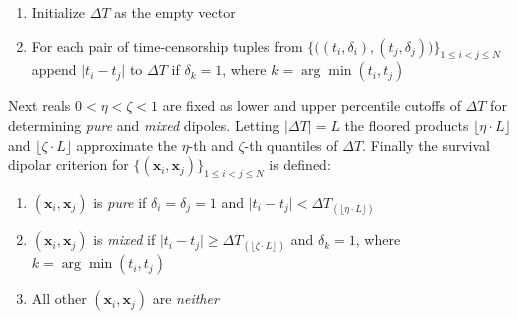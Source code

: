\documentclass[sn-mathphys]{sn-jnl}%
\theoremstyle{thmstyleone}%
\theoremstyle{thmstyletwo}%
\theoremstyle{thmstylethree}%
\begin{document}
\begin{enumerate}[(1)]
\item Initialize $\Delta T$ as the empty vector
\item For each pair of time-censorship tuples from $\big\{\big((t_i, \delta_i),(t_j, \delta_j)\big)\big\}_{1 \leq i < j \leq N}$ append $\lvert t_i - t_j \rvert$ to $\Delta T$ if $\delta_k = 1$, where $k = \arg\min(t_i, t_j)$
\end{enumerate} Next reals $0 < \eta < \zeta < 1$ are fixed as lower and upper percentile cutoffs of $\Delta T$ for determining \emph{pure} and \emph{mixed} dipoles.  Letting $\lvert\Delta T\rvert = L $ the floored products $\lfloor \eta \cdot L \rfloor$ and $\lfloor \zeta \cdot L \rfloor$ approximate the $\eta$-th and $\zeta$-th quantiles of $\Delta T$. Finally the survival dipolar criterion for $\{ (\mathbf{x}_i, \mathbf{x}_j) \}_{  1 \leq i < j \leq N }$ is defined:
\begin{enumerate}[(1)]
	\item $(\mathbf{x}_i, \mathbf{x}_j)$ is \emph{pure} if $\delta_i = \delta_j = 1$ and $\lvert t_i - t_j \rvert < \Delta T_{(\lfloor \eta \cdot L \rfloor)}$
	\item $(\mathbf{x}_i, \mathbf{x}_j)$  is \emph{mixed} if $\lvert t_i - t_j \rvert \geq \Delta T_{(\lfloor \zeta \cdot L \rfloor)}$ and $\delta_k = 1$, where $k = \arg\min(t_i, t_j)$
	
	\item All other $(\mathbf{x}_i, \mathbf{x}_j)$ are \emph{neither}
\end{enumerate}
\end{document}
